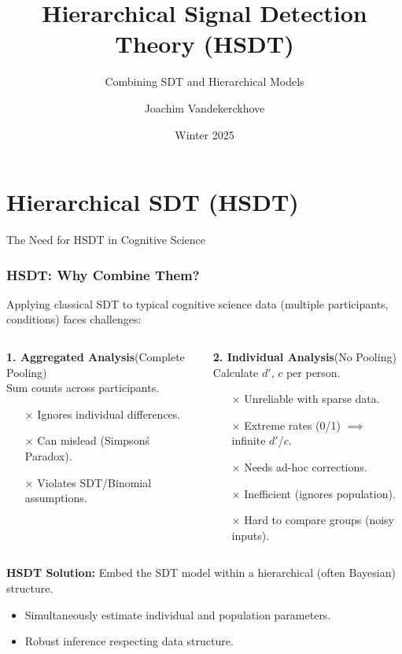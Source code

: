\documentclass[aspectratio=169]{beamer}
\title{Hierarchical Signal Detection Theory (HSDT)}
\subtitle{Combining SDT and Hierarchical Models}
\author{Joachim Vandekerckhove}
\date{Winter 2025}
\begin{document}
\maketitle

\section{Hierarchical SDT (HSDT)}

\begin{frame}{The Need for HSDT in Cognitive Science}
    \frametitle{HSDT: Why Combine Them?}
    Applying classical SDT to typical cognitive science data (multiple participants, conditions) faces challenges:
    \pause
    \begin{columns}[T]
        \begin{column}{0.5\textwidth}
            \textbf{1. Aggregated Analysis}\quad (Complete Pooling)\\
            \small Sum counts across participants.
            \begin{itemize}
                \item[$\times$] Ignores individual differences.
                \item[$\times$] Can mislead (Simpson\'s Paradox).
                \item[$\times$] Violates SDT/Binomial assumptions.
            \end{itemize}
        \end{column}
        \pause
        \begin{column}{0.5\textwidth}
            \textbf{2. Individual Analysis}\quad (No Pooling)\\
            \small Calculate $d'$, $c$ per person.
            \begin{itemize}
                \item[$\times$] Unreliable with sparse data.
                \item[$\times$] Extreme rates (0/1) $\implies$ infinite $d'$/$c$.
                \item[$\times$] Needs ad-hoc corrections.
                \item[$\times$] Inefficient (ignores population).
                \item[$\times$] Hard to compare groups (noisy inputs).
            \end{itemize}
        \end{column}
    \end{columns}
    \pause
    \vfill
    \textbf{HSDT Solution:} Embed the SDT model within a hierarchical (often Bayesian) structure.
    \begin{itemize}
        \item Simultaneously estimate individual and population parameters.
        \item Robust inference respecting data structure.
    \end{itemize}
\end{frame}
\end{document}
